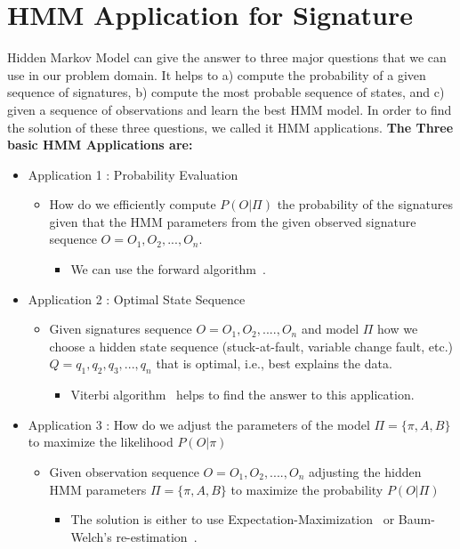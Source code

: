 \section{HMM Application for Signature}
Hidden Markov Model can give the answer to three major questions that we can use in our problem domain. It helps to a) compute the probability of a given sequence of signatures, b) compute the most probable sequence of states, and c) given a sequence of observations and learn the best HMM model.
In order to find the solution of these three questions, we called it HMM applications.
\textbf{The Three basic HMM Applications are:}
\begin{itemize}
\item Application 1 : Probability Evaluation
 \begin{itemize}
 \item How do we efficiently compute $P(O|\Pi)$ the probability of the signatures given that the HMM parameters from the given observed signature sequence $O = {O_1, O_2,...,O_n}$.
 
  \begin{itemize}
  \item We can use the forward algorithm~\cite{ghahramani1996factorial}.
  \end{itemize}
 \end{itemize}
\end{itemize}
\begin{itemize}
\item Application 2 : Optimal State Sequence
 \begin{itemize}
 \item Given signatures sequence $O = {O_1, O_2, ...., }O_n$ and model $\Pi$ how we choose a hidden state sequence (stuck-at-fault, variable change fault, etc.) $Q={q_1,q_2,q_3, ..., q_n}$
that is optimal, i.e., best explains the data. 
  \begin{itemize}
  \item Viterbi algorithm~\cite{forney1973viterbi} helps to find the answer to this application.
  \end{itemize}
 \end{itemize}
\end{itemize}
\begin{itemize}
\item Application 3 : How do we adjust the parameters of the model $\Pi = \{\pi, A, B\}$ to maximize the likelihood $P(O|\pi)$ 
 \begin{itemize}
 \item Given observation sequence $O = {O_1, O_2,....,} O_n$ adjusting the hidden HMM parameters $ \Pi = \{\pi,A, B\}$ to maximize the probability $P(O|\Pi)$ 
  \begin{itemize}
  \item The solution is either to use Expectation-Maximization~\cite{moon1996expectation} or Baum-Welch’s re-estimation~\cite{leggetter1995maximum}.
  \end{itemize}
 \end{itemize}
\end{itemize}


